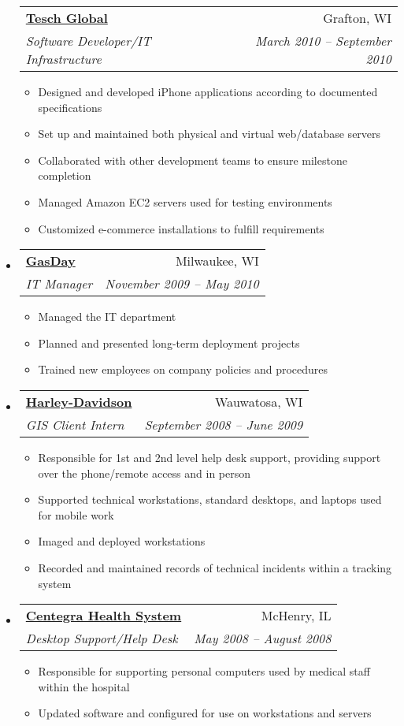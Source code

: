 \documentclass[letterpaper,12pt]{article}
\makeatletter
\newcommand{\resitem}[1]{\item #1 \vspace{-2pt}}
\newcommand{\ressubheading}[4]{
      \begin{tabular*}{6.5in}{l@{\extracolsep{\fill}}r}
        \textbf{#1} & #2 \\
        \textit{#3} & \textit{#4} \\
      \end{tabular*}\vspace{-6pt}}
\makeatother
\begin{document}
\begin{itemize}
         \ressubheading{\href{http://www.teschglobal.com/}{Tesch Global}}{Grafton, WI}{Software Developer/IT Infrastructure}{March 2010 -- September 2010}
        { \footnotesize
        \begin{itemize}
            \resitem{Designed and developed iPhone applications according to documented specifications}
            \resitem{Set up and maintained both physical and virtual web/database servers}
            \resitem{Collaborated with other development teams to ensure milestone completion}
            \resitem{Managed Amazon EC2 servers used for testing environments}
            \resitem{Customized e-commerce installations to fulfill requirements}
        \end{itemize}
         }

       \item
         \ressubheading{\href{http://www.gasday.com/web/}{GasDay}}{Milwaukee, WI}{IT Manager}{November 2009 -- May 2010}
        { \footnotesize
        \begin{itemize}
            \resitem{Managed the IT department}
            \resitem{Planned and presented long-term deployment projects}
            \resitem{Trained new employees on company policies and procedures}
        \end{itemize}
         }
       \item
         \ressubheading{\href{http://www.harley-davidson.com/}{Harley-Davidson}}{Wauwatosa, WI}{GIS Client Intern}{September 2008 -- June 2009}
        { \footnotesize
        \begin{itemize}
            \resitem{Responsible for 1st and 2nd level help desk support, providing support over the phone/remote access and in person}
            \resitem{Supported technical workstations, standard desktops, and laptops used for mobile work}
            \resitem{Imaged and deployed workstations}
            \resitem{Recorded and maintained records of technical incidents within a tracking system}
        \end{itemize}
         }
       \item
         \ressubheading{\href{http://centegra.org/}{Centegra Health System}}{McHenry, IL}{Desktop Support/Help Desk}{May 2008 -- August 2008}
        { \footnotesize
        \begin{itemize}
            \resitem{Responsible for supporting personal computers used by medical staff within the hospital}
            \resitem{Updated software and configured for use on workstations and servers}

\end{itemize}}
\end{itemize}
\end{document}
